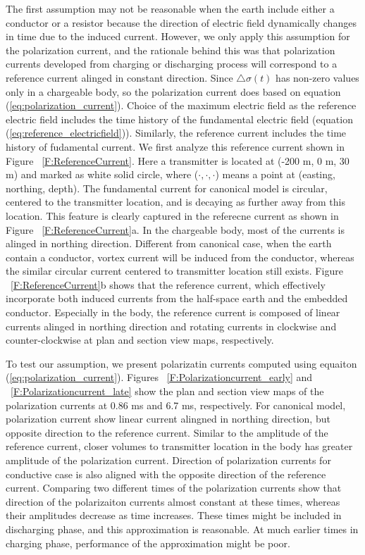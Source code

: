 \documentclass[a4paper, 11pt]{article}
\newcommand{\dsig}{\triangle\sigma}
\begin{document}
The first assumption may not be reasonable when the earth include either a conductor or a resistor because the direction of electric field dynamically changes in time due to the induced current. 
However, we only apply this assumption for the polarization current, and the rationale behind this was that polarization currents developed from charging or discharging process will correspond to a reference current alinged in constant direction. 
Since $\dsig(t)$ has non-zero values only in a chargeable body, so the polarization current does based on equation (\ref{eq:polarization_current}). 
Choice of the maximum electric field as the reference electric field includes the time history of the fundamental electric field (equation (\ref{eq:reference_electricfield})). 
Similarly, the reference current includes the time history of  fudamental current. 
We first analyze this reference current shown in Figure ~\ref{F:ReferenceCurrent}. 
Here a transmitter is located at (-200 m, 0 m, 30 m) and marked as white solid circle, where ($\cdot, \cdot, \cdot$) means a point at (easting, northing, depth).  
The fundamental current for canonical model is circular, centered to the transmitter location, and is decaying as further away from this location. This feature is clearly captured in the referecne current as shown in Figure ~\ref{F:ReferenceCurrent}a. 
In the chargeable body, most of the currents is alinged in northing direction. 
Different from canonical case, when the earth contain a conductor, vortex current will be induced from the conductor, whereas the similar circular current centered to transmitter location still exists.  
Figure ~\ref{F:ReferenceCurrent}b shows that the reference current, which effectively incorporate both induced currents from the half-space earth and the embedded conductor.  
Especially in the body, the reference current is composed of linear currents alinged in northing direction and rotating currents in clockwise and counter-clockwise at plan and section view maps, respectively. 

To test our assumption, we present polarizatin currents computed using equaiton (\ref{eq:polarization_current}). 
Figures ~\ref{F:Polarizationcurrent_early} and ~\ref{F:Polarizationcurrent_late} show the plan and section view maps of the polarization currents at 0.86 ms and 6.7 ms, respectively. 
For canonical model, polarization current show linear current alingned in northing direction, but opposite direction to the reference current. 
Similar to the amplitude of the reference current, closer volumes to transmitter location in the body has greater amplitude of the polarization current. 
Direction of polarization currents for conductive case is also aligned with the opposite direction of the reference current.
Comparing two different times of the polarization currents show that direction of the polarizaiton currents almost constant at these times, whereas their amplitudes decrease as time increases. 
These times might be included in discharging phase, and this approximation is reasonable. 
At much earlier times in charging phase, performance of the approximation might be poor. 
\end{document}
